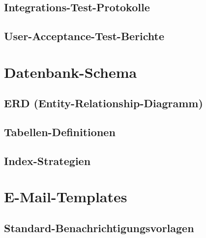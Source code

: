 \documentclass[11pt,a4paper]{article}
\begin{document}
\subsection{Integrations-Test-Protokolle}

\subsection{User-Acceptance-Test-Berichte}

\section{Datenbank-Schema}

\subsection{ERD (Entity-Relationship-Diagramm)}

\subsection{Tabellen-Definitionen}

\subsection{Index-Strategien}

\section{E-Mail-Templates}

\subsection{Standard-Benachrichtigungsvorlagen}
\end{document}
